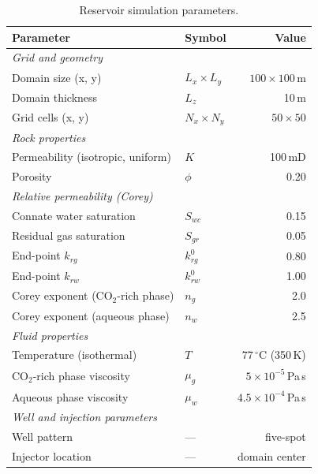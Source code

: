 \documentclass[preprint,12pt,number]{elsarticle}
\begin{document}
\begin{table}[H]
  \centering
  \caption{Reservoir simulation parameters.}
  \label{tab:sim_setup}
  \begin{tabular}{llr}
    \toprule
    Parameter & Symbol & Value \\
    \midrule
    \multicolumn{3}{l}{\textit{Grid and geometry}} \\
    Domain size (x, y)                 & $L_x \times L_y$ & $100 \times 100$\,m \\
    Domain thickness                   & $L_z$            & 10\,m \\
    Grid cells (x, y)                  & $N_x \times N_y$ & $50 \times 50$ \\
    \midrule
    \multicolumn{3}{l}{\textit{Rock properties}} \\
    Permeability (isotropic, uniform)  & $K$              & 100\,mD \\
    Porosity                           & $\phi$           & 0.20 \\
    \midrule
    \multicolumn{3}{l}{\textit{Relative permeability (Corey)}} \\
    Connate water saturation           & $S_{wc}$         & 0.15 \\
    Residual gas saturation            & $S_{gr}$         & 0.05 \\
    End-point $k_{rg}$                 & $k_{rg}^0$       & 0.80 \\
    End-point $k_{rw}$                 & $k_{rw}^0$       & 1.00 \\
    Corey exponent (CO$_2$-rich phase) & $n_g$            & 2.0  \\
    Corey exponent (aqueous phase)     & $n_w$            & 2.5  \\
    \midrule
    \multicolumn{3}{l}{\textit{Fluid properties}} \\
    Temperature (isothermal)           & $T$              & $77\,^\circ$C (350\,K) \\
    CO$_2$-rich phase viscosity        & $\mu_g$          & $5\times10^{-5}$\,Pa\,s \\
    Aqueous phase viscosity            & $\mu_w$          & $4.5\times10^{-4}$\,Pa\,s \\
    \midrule
    \multicolumn{3}{l}{\textit{Well and injection parameters}} \\
    Well pattern                       & ---              & five-spot \\
    Injector location                  & ---              & domain center \\

\end{tabular}
\end{table}
\end{document}
